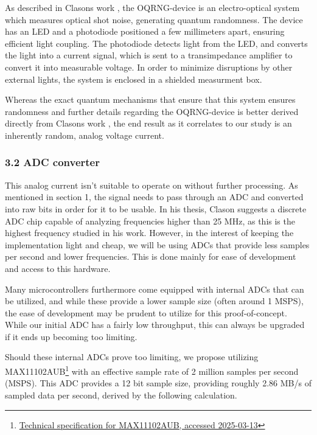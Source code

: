 As described in Clasons work \cite{Clason2023}, the OQRNG-device is an electro-optical system which measures optical shot noise, generating quantum randomness. The device has an LED and a photodiode positioned a few millimeters apart, ensuring efficient light coupling. The photodiode detects light from the LED, and converts the light into a current signal, which is sent to a transimpedance amplifier to convert it into measurable voltage. In order to minimize disruptions by other external lights, the system is enclosed in a shielded measurment box.

Whereas the exact quantum mechanisms that ensure that this system ensures randomness and further details regarding the OQRNG-device is better derived directly from Clasons work \cite{Clason2023}, the end result as it correlates to our study is an inherently random, analog voltage current.

\hypertarget{adc-converter}{%
\subsubsection{3.2 ADC converter}\label{adc-converter}}

This analog current isn't suitable to operate on without further processing. As mentioned in section 1, the signal needs to pass through an ADC and converted into raw bits in order for it to be usable. In his thesis, Clason \cite{Clason2023} suggests a discrete ADC chip capable of analyzing frequencies higher than 25 MHz, as this is the highest frequency studied in his work. However, in the interest of keeping the implementation light and cheap, we will be using ADCs that provide less samples per second and lower frequencies. This is done mainly for ease of development and access to this hardware.

Many microcontrollers furthermore come equipped with internal ADCs that can be utilized, and while these provide a lower sample size (often around 1 MSPS), the ease of development may be prudent to utilize for this proof-of-concept. While our initial ADC has a fairly low throughput, this can always be upgraded if it ends up becoming too limiting.

Should these internal ADCs prove too limiting, we propose utilizing MAX11102AUB\footnote{\href{https://www.farnell.com/datasheets/1913106.pdf}{Technical specification for MAX11102AUB, accessed 2025-03-13}} with an effective sample rate of 2 million samples per second (MSPS). This ADC provides a 12 bit sample size, providing roughly 2.86 MB/s of sampled data per second, derived by the following calculation.

